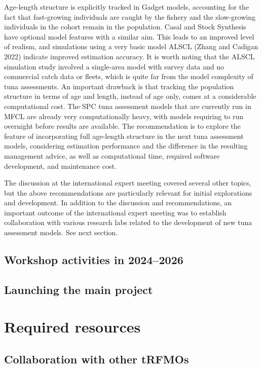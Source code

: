 \documentclass{SCreport}
\begin{document}
Age-length structure is explicitly tracked in Gadget models, accounting for the
fact that fast-growing individuals are caught by the fishery and the
slow-growing individuals in the cohort remain in the population. Casal and Stock
Synthesis have optional model features with a similar aim. This leads to an
improved level of realism, and simulations using a very basic model ALSCL (Zhang
and Cadigan 2022) indicate improved estimation accuracy. It is worth noting that
the ALSCL simulation study involved a single-area model with survey data and no
commercial catch data or fleets, which is quite far from the model complexity of
tuna assessments. An important drawback is that tracking the population
structure in terms of age and length, instead of age only, comes at a
considerable computational cost. The SPC tuna assessment models that are
currently run in MFCL are already very computationally heavy, with models
requiring to run overnight before results are available. The recommendation is
to explore the feature of incorporating full age-length structure in the next
tuna assessment models, considering estimation performance and the difference in
the resulting management advice, as well as computational time, required
software development, and maintenance cost.

The discussion at the international expert meeting covered several other topics,
but the above recommendations are particularly relevant for initial explorations
and development. In addition to the discussion and recommendations, an important
outcome of the international expert meeting was to establish collaboration with
various research labs related to the development of new tuna assessment models.
See next section.

\subsection{Workshop activities in 2024--2026}

\subsection{Launching the main project}

\section{Required resources}

\subsection{Collaboration with other tRFMOs}
\end{document}
